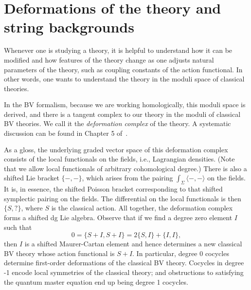 \section{Deformations of the theory and string backgrounds}




Whenever one is studying a theory,
it is helpful to understand how it can be modified 
and how features of the theory change as one adjusts natural parameters of the theory,
such as coupling constants of the action functional.
In other words, one wants to understand the theory in the moduli space of classical theories.

In the BV formalism, because we are working homologically, this moduli space is derived,
and there is a tangent complex to our theory in the moduli of classical BV theories.
We call it the {\em deformation complex} of the theory.
A systematic discussion can be found in Chapter 5 of~\cite{CosBook}.

As a gloss, the underlying graded vector space of this deformation complex consists of the local functionals on the fields, i.e., Lagrangian densities. 
(Note that we allow local functionals of arbitrary cohomological degree.) 
There is also a shifted Lie bracket $\{-,-\}$, 
which arises from the pairing $\int_\Sigma \langle-,-\rangle$ on the fields.
It is, in essence, the shifted Poisson bracket corresponding to that shifted symplectic pairing on the fields.
The differential on the local functionals is then $\{S,?\}$, where $S$ is the classical action. 
All together, the deformation complex forms a shifted dg Lie algebra. 
Observe that if we find a degree zero element $I$ such that
\[
0=\{S +I,S +I\}=2\{S,I\}+\{I,I\},
\]
then $I$ is a shifted Maurer-Cartan element and 
hence determines a new classical BV theory whose action functional is $S + I$. 
In particular, degree 0 cocycles determine first-order deformations of the classical BV theory. Cocycles in degree -1 encode local symmetries of the classical theory; 
and obstructions to satisfying the quantum master equation end up being degree 1 cocycles.

